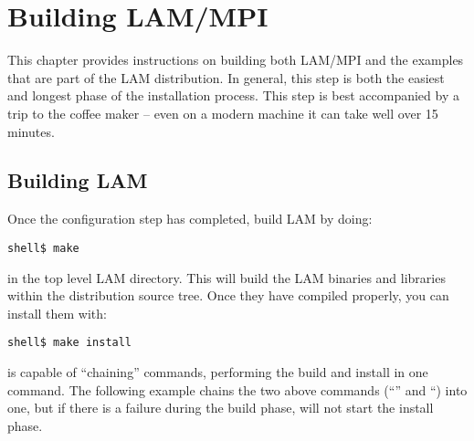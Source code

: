 %
% 
%
%

\chapter{Building LAM/MPI}

This chapter provides instructions on building both LAM/MPI and the
examples that are part of the LAM distribution.  In general, this step
is both the easiest and longest phase of the installation process.
This step is best accompanied by a trip to the coffee maker -- even on
a modern machine it can take well over 15 minutes.


\section{Building LAM}

Once the configuration step has completed, build LAM by doing:

\lstset{style=lam-cmdline}
\begin{lstlisting}
shell$ make
\end{lstlisting}
%
in the top level LAM directory. This will build the LAM binaries and
libraries within the distribution source tree.  Once they have
compiled properly, you can install them with:

\lstset{style=lam-cmdline}
\begin{lstlisting}
shell$ make install
\end{lstlisting}
%
 is capable of ``chaining'' commands, performing the build
and install in one command.  The following example chains the two
above commands (``'' and ``) into
one, but if there is a failure during the build phase,  will
not start the install phase.

